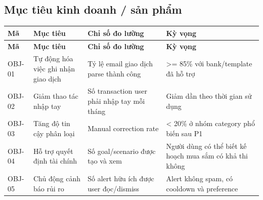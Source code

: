 \documentclass[11pt,a4paper]{article}
\renewcommand{\thead}[1]{\textbf{\color{PrimaryDark}#1}}
\newenvironment{tableblock}{\Needspace{8\baselineskip}\vspace{0.25em}}{\vspace{0.75em}}
\begin{document}
\subsection{Mục tiêu kinh doanh / sản phẩm}
\begin{tableblock}
\scriptsize
\begin{longtable}{L{1.8cm}L{4.1cm}L{4.5cm}L{5.0cm}}
\thead{Mã} & \thead{Mục tiêu} & \thead{Chỉ số đo lường} & \thead{Kỳ vọng} \\
\endfirsthead
{}\thead{Mã} & \thead{Mục tiêu} & \thead{Chỉ số đo lường} & \thead{Kỳ vọng} \\
\endhead
OBJ-01 & Tự động hóa việc ghi nhận giao dịch & Tỷ lệ email giao dịch parse thành công & >= 85\% với bank/template đã hỗ trợ \\
OBJ-02 & Giảm thao tác nhập tay & Số transaction user phải nhập tay mỗi tháng & Giảm dần theo thời gian sử dụng \\
OBJ-03 & Tăng độ tin cậy phân loại & Manual correction rate & < 20\% ở nhóm category phổ biến sau P1 \\
OBJ-04 & Hỗ trợ quyết định tài chính & Số goal/scenario được tạo và xem & Người dùng có thể biết kế hoạch mua sắm có khả thi không \\
OBJ-05 & Chủ động cảnh báo rủi ro & Số alert hữu ích được user đọc/dismiss & Alert không spam, có cooldown và preference \\
\end{longtable}
\end{tableblock}
\end{document}
